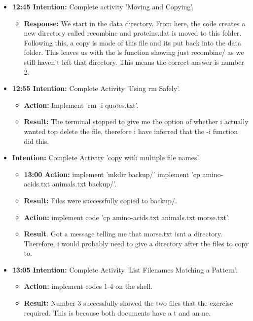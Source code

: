 \documentclass{article}
\begin{document}
\begin{itemize}
\item{\textbf{ 12:45 Intention:} Complete activity 'Moving and Copying'.}

\begin{itemize}
    \item{\textbf{Response:} We start in the data directory. From here, the code creates a new directory called recombine and proteins.dat is moved to this folder. Following this, a copy is made of this file and its put back into the data folder. This leaves us with the ls function showing just recombine/ as we still haven't left that directory. This means the correct answer is number 2.}
\end{itemize}

\item{\textbf{12:55 Intention:} Complete Activity 'Using rm Safely'.}

\begin{itemize}
\item{\textbf{Action:} Implement 'rm -i quotes.txt'.}
\item{\textbf{Result:} The terminal stopped to give me the option of whether i actually wanted top delete the file, therefore i have inferred that the -i function did this.}
\end{itemize}

\item{\textbf{Intention:} Complete Activity 'copy with multiple file names'.}

\begin{itemize}
\item{\textbf{ 13:00 Action:} implement 'mkdir backup/' implement 'cp amino-acids.txt animals.txt backup/'.}
\item{\textbf{Result:} Files were successfully copied to backup/.}
\item{\textbf{Action:} implement code 'cp amino-acids.txt animals.txt morse.txt'.}
\item{\textbf{Result}. Got a message telling me that morse.txt isnt a directory. Therefore, i would probably need to give a directory after the files to copy to.}

\end{itemize}

\item{\textbf{13:05 Intention:} Complete Activity 'List Filenames Matching a Pattern'.}

\begin{itemize}
\item{\textbf{Action:} implement codes 1-4 on the shell.}
\item{\textbf{Result:} Number 3 successfully showed the two files that the exercise required. This is because both documents have a t and an ne.}
\end{itemize}


\end{itemize}
\end{document}
